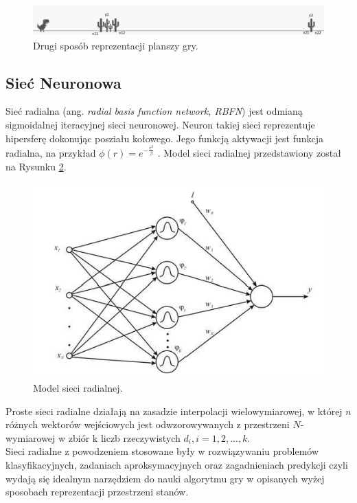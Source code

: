 \documentclass[11pt]{article} %
\begin{document}
\begin{figure}[h]
\centering
\includegraphics[width=12cm]{images/representation}
\caption{Drugi sposób reprezentacji planszy gry.} \label{fig:representation}
\end{figure}


\subsection{Sieć Neuronowa}
 
Sieć radialna (ang. \textit{radial basis function network, RBFN}) jest odmianą sigmoidalnej iteracyjnej sieci neuronowej. Neuron takiej sieci reprezentuje hipersferę dokonując posziału kołowego. Jego funkcją aktywacji jest funkcja radialna, na przykład $\phi (r) = e^{-\frac{r^2}{\beta}}$ . Model sieci radialnej przedstawiony został na Rysunku \ref{fig:radial_network}. \\


\begin{figure}[h]
\centering
\includegraphics[width=12cm]{images/radial_network}
\caption{Model sieci radialnej.} \label{fig:radial_network}
\end{figure}

Proste sieci radialne działają na zasadzie interpolacji wielowymiarowej, w której $n$ różnych wektorów wejściowych jest odwzorowywanych z przestrzeni $N$-wymiarowej w zbiór k liczb rzeczywistych $d_i, {i = 1, 2, ..., k}$. \\


Sieci radialne z powodzeniem stosowane były w rozwiązywaniu problemów klasyfikacyjnych, zadaniach aproksymacyjnych oraz zagadnieniach predykcji czyli wydają się idealnym narzędziem do nauki algorytmu gry w opisanych wyżej sposobach reprezentacji przestrzeni stanów. \\
\end{document}
